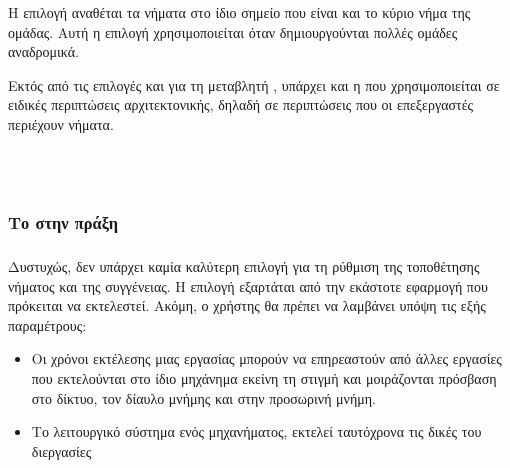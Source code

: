 Η επιλογή \emph{} αναθέται τα νήματα στο ίδιο σημείο που είναι και το κύριο νήμα της ομάδας. Αυτή η επιλογή χρησιμοποιείται όταν δημιουργούνται πολλές ομάδες αναδρομικά.

Εκτός από τις επιλογές \emph{} και \emph{} για τη μεταβλητή \emph{}, υπάρχει και η \emph{} που χρησιμοποιείται σε ειδικές περιπτώσεις αρχιτεκτονικής, δηλαδή σε περιπτώσεις που οι επεξεργαστές περιέχουν νήματα\cite{affinity2}.

\ \\
\ \\
\subsubsection{Το \emph{} στην πράξη}
\subparagraph{}
Δυστυχώς, δεν υπάρχει καμία καλύτερη επιλογή για τη ρύθμιση της τοποθέτησης νήματος και της συγγένειας. Η επιλογή εξαρτάται από την εκάστοτε εφαρμογή που πρόκειται να εκτελεστεί. Ακόμη, ο χρήστης θα πρέπει να λαμβάνει υπόψη τις εξής παραμέτρους\cite{affinity3}:
\begin{itemize}
\item{Οι χρόνοι εκτέλεσης μιας εργασίας μπορούν να επηρεαστούν από άλλες εργασίες που εκτελούνται στο ίδιο μηχάνημα εκείνη τη στιγμή και μοιράζονται πρόσβαση στο δίκτυο, τον δίαυλο μνήμης και στην προσωρινή μνήμη.}
\item{Το λειτουργικό σύστημα ενός μηχανήματος, εκτελεί ταυτόχρονα τις δικές του διεργασίες}
\end{itemize}